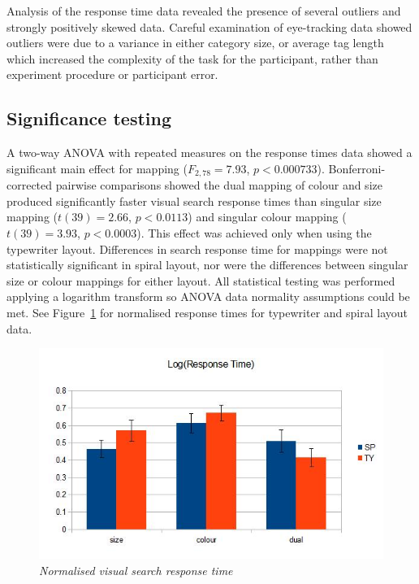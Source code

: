 Analysis of the response time data revealed the presence of several outliers and strongly positively skewed data. Careful examination of eye-tracking data showed outliers were due to a variance in either category size, or average tag length which increased the complexity of the task for the participant, rather than experiment procedure or participant error. 

\subsection{Significance testing}

A two-way ANOVA with repeated measures on the response times data showed a significant main effect for mapping ($F_{2,78}=7.93$, $p<0.000733$). Bonferroni-corrected pairwise comparisons showed the dual mapping of colour and size produced significantly faster visual search response times than singular size mapping ($t(39)=2.66$, $p<0.0113$) and singular colour mapping ($t(39)=3.93$, $p<0.0003$). This effect was achieved only when using the typewriter layout. Differences in search response time for mappings were not statistically significant in spiral layout, nor were the differences between singular size or colour mappings for either layout. All statistical testing was performed applying a logarithm transform so ANOVA data normality assumptions could be met. See Figure~\ref{fig:exp2log} for normalised response times for typewriter and spiral layout data.

\begin{figure}[h!]
	\centering
	\includegraphics[scale=0.40]{exp2log.jpg}
	\caption{\textit{Normalised visual search response time}}
	\label{fig:exp2log}
\end{figure}

